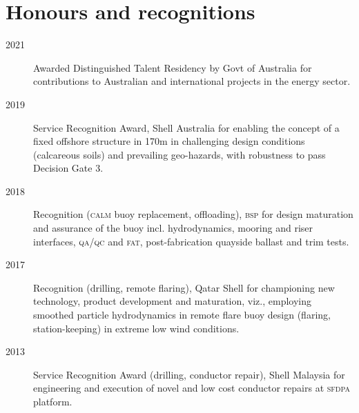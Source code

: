 \section*{Honours and recognitions} %
\label{sec:hon}

\begin{description}
\item[2021]Awarded Distinguished Talent Residency by Govt of Australia for contributions to Australian and international projects in the energy sector.

\item[2019]Service Recognition Award, Shell Australia for enabling the concept of a fixed offshore structure in 170m in challenging design conditions (calcareous soils) and prevailing geo-hazards, with robustness to pass Decision Gate 3.

\item[2018]Recognition (\textsc{calm} buoy replacement, offloading), \textsc{bsp} for design maturation and assurance of the buoy incl. hydrodynamics, mooring and riser interfaces, \textsc{qa}/\textsc{qc} and \textsc{fat}, post-fabrication quayside ballast and trim tests.

\item[2017]Recognition (drilling, remote flaring), Qatar Shell for championing new technology, product development and maturation, viz., employing smoothed particle hydrodynamics in remote flare buoy design (flaring, station-keeping) in extreme low wind conditions.


\item[2013]Service Recognition Award (drilling, conductor repair), Shell Malaysia for engineering and execution of novel and low cost conductor repairs at \textsc{sfdpa} platform.



\end{description}

